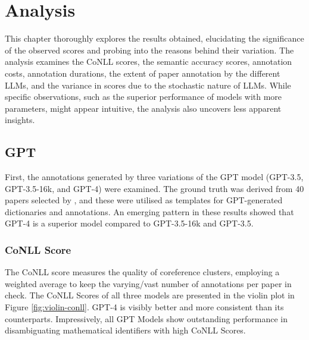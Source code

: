 \chapter{Analysis}\label{chapter:analysis}

This chapter thoroughly explores the results obtained, elucidating the significance of the observed scores and probing into the reasons behind their variation. The analysis examines the CoNLL scores, the semantic accuracy scores, annotation costs, annotation durations, the extent of paper annotation by the different \ac{LLMs}, and the variance in scores due to the stochastic nature of \ac{LLMs}. While specific observations, such as the superior performance of models with more parameters, might appear intuitive, the analysis also uncovers less apparent insights.

\section{GPT}
First, the annotations generated by three variations of the GPT model (GPT-3.5, GPT-3.5-16k, and GPT-4) were examined. The ground truth was derived from 40 papers selected by \citet{asakura2022building}, and these were utilised as templates for GPT-generated dictionaries and annotations. An emerging pattern in these results showed that GPT-4 is a superior model compared to GPT-3.5-16k and GPT-3.5. 

\subsection{CoNLL Score}
The CoNLL score measures the quality of coreference clusters, employing a weighted average to keep the varying/vast number of annotations per paper in check. The CoNLL Scores of all three models are presented in the violin plot in Figure \ref{fig:violin-conll}. GPT-4 is visibly better and more consistent than its counterparts. Impressively, all GPT Models show outstanding performance in disambiguating mathematical identifiers with high CoNLL Scores.

